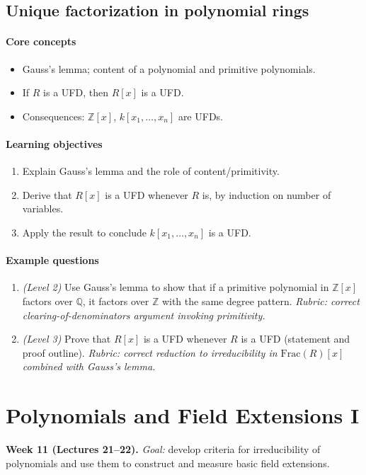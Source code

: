\documentclass{article}
\begin{document}
\subsection{Unique factorization in polynomial rings}
\paragraph{Core concepts}
\begin{itemize}[nosep]
  \item Gauss's lemma; content of a polynomial and primitive polynomials.
  \item If $R$ is a UFD, then $R[x]$ is a UFD.
  \item Consequences: $\mathbb{Z}[x]$, $k[x_1,\ldots,x_n]$ are UFDs.
\end{itemize}
\paragraph{Learning objectives}
\begin{enumerate}[nosep]
  \item Explain Gauss's lemma and the role of content/primitivity.
  \item Derive that $R[x]$ is a UFD whenever $R$ is, by induction on number of variables.
  \item Apply the result to conclude $k[x_1,\ldots,x_n]$ is a UFD.
\end{enumerate}
\paragraph{Example questions}
\begin{enumerate}[nosep]
  \item \emph{(Level 2)} Use Gauss's lemma to show that if a primitive polynomial in $\mathbb{Z}[x]$ factors over $\mathbb{Q}$, it factors over $\mathbb{Z}$ with the same degree pattern. \emph{Rubric: correct clearing-of-denominators argument invoking primitivity.}
  \item \emph{(Level 3)} Prove that $R[x]$ is a UFD whenever $R$ is a UFD (statement and proof outline). \emph{Rubric: correct reduction to irreducibility in $\mathrm{Frac}(R)[x]$ combined with Gauss's lemma.}
\end{enumerate}

\section{Polynomials and Field Extensions I}
\textbf{Week 11 (Lectures 21--22).} \emph{Goal:} develop criteria for irreducibility of polynomials and use them to construct and measure basic field extensions.
\end{document}
